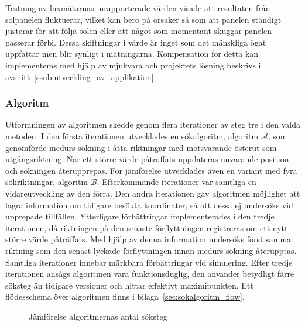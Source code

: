             Testning av luxmätarnas inrapporterade värden visade att resultaten från solpanelen fluktuerar, vilket kan bero på orsaker så som att panelen ständigt justerar för att följa solen eller att något som momentant skuggar panelen passerar förbi. Dessa skiftningar i värde är inget som det mänskliga ögat uppfattar men blir synligt i mätningarna. Kompensation för detta kan implementeras med hjälp av mjukvara och projektets lösning beskrivs i avsnitt~\ref{ssub:utveckling_av_applikation}.\bigskip




        \subsubsection{Algoritm} %
        \label{ssub:utveckling_av_algoritm}
            Utformningen av algoritmen skedde genom flera iterationer av steg tre i den valda metoden. I den första iterationen utvecklades en sökalgoritm, algoritm $\mathscr{A}$, som genomförde medurs sökning i åtta riktningar med motsvarande österut som utgångsriktning. När ett större värde påträffats uppdateras nuvarande position och sökningen återupprepas. För jämförelse utvecklades även en variant med fyra sökriktningar, algoritm $\mathscr{B}$. Efterkommande iterationer var samtliga en vidareutveckling av den förra. Den andra iterationen gav algoritmen möjlighet att lagra information om tidigare besökta koordinater, så att dessa ej undersöks vid upprepade tillfällen. Ytterligare förbättringar implementerades i den tredje iterationen, då riktningen på den senaste förflyttningen registreras om ett nytt större värde påträffats. Med hjälp av denna information undersöks först samma riktning som den senast lyckade förflyttningen innan medurs sökning återupptas. Samtliga iterationer innebar märkbara förbättringar vid simulering. Efter tredje iterationen ansågs algoritmen vara funktionsduglig, den använder betydligt färre söksteg än tidigare versioner och hittar effektivt maximipunkten. Ett flödesschema över algoritmen finns i bilaga~\ref{sec:sokalgoritm_flow}.\bigskip

            \begin{figure}
                
            \caption{\label{fig:algoritm_steg} Jämförelse algoritmernas antal söksteg}
            \end{figure} 


